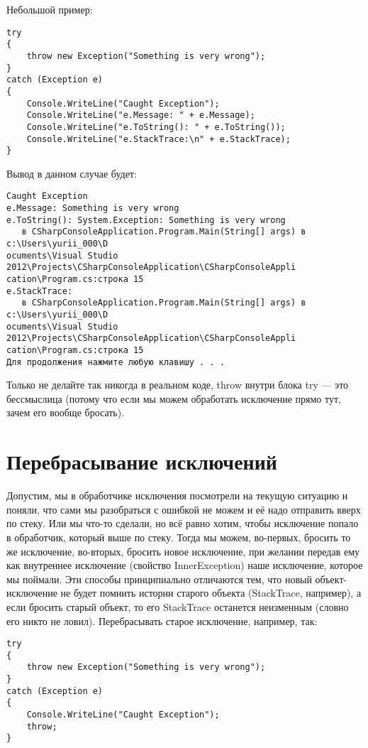 \documentclass{../../text-style}
\begin{document}
Небольшой пример:

\begin{verbatim}
try
{
    throw new Exception("Something is very wrong");
}
catch (Exception e)
{
    Console.WriteLine("Caught Exception");
    Console.WriteLine("e.Message: " + e.Message);
    Console.WriteLine("e.ToString(): " + e.ToString());
    Console.WriteLine("e.StackTrace:\n" + e.StackTrace);
}
\end{verbatim}

Вывод в данном случае будет:

\begin{verbatim}
Caught Exception
e.Message: Something is very wrong
e.ToString(): System.Exception: Something is very wrong
   в CSharpConsoleApplication.Program.Main(String[] args) в c:\Users\yurii_000\D
ocuments\Visual Studio 2012\Projects\CSharpConsoleApplication\CSharpConsoleAppli
cation\Program.cs:строка 15
e.StackTrace:
   в CSharpConsoleApplication.Program.Main(String[] args) в c:\Users\yurii_000\D
ocuments\Visual Studio 2012\Projects\CSharpConsoleApplication\CSharpConsoleAppli
cation\Program.cs:строка 15
Для продолжения нажмите любую клавишу . . .
\end{verbatim}

Только не делайте так никогда в реальном коде, throw внутри блока try --- это бессмыслица (потому что если мы можем обработать исключение прямо тут, зачем его вообще бросать).

\section{Перебрасывание исключений}

Допустим, мы в обработчике исключения посмотрели на текущую ситуацию и поняли, что сами мы разобраться с ошибкой не можем и её надо отправить вверх по стеку. Или мы что-то сделали, но всё равно хотим, чтобы исключение попало в обработчик, который выше по стеку. Тогда мы можем, во-первых, бросить то же исключение, во-вторых, бросить новое исключение, при желании передав ему как внутреннее исключение (свойство InnerException) наше исключение, которое мы поймали. Эти способы принципиально отличаются тем, что новый объект-исключение не будет помнить истории старого объекта (StackTrace, например), а если бросить старый объект, то его StackTrace останется неизменным (словно его никто не ловил). Перебрасывать старое исключение, например, так:

\begin{verbatim}
try
{
    throw new Exception("Something is very wrong");
}
catch (Exception e)
{
    Console.WriteLine("Caught Exception");
    throw;
}
\end{verbatim}
\end{document}
